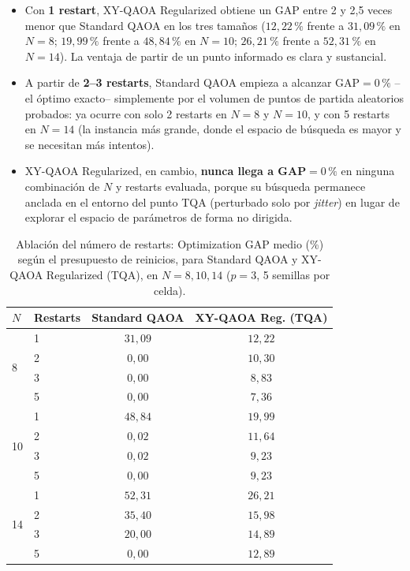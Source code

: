 \begin{itemize}
    \item Con \textbf{1 restart}, XY-QAOA Regularized obtiene un GAP entre 2 y 2,5 veces menor que Standard QAOA en los tres tamaños ($12{,}22\,\%$ frente a $31{,}09\,\%$ en $N=8$; $19{,}99\,\%$ frente a $48{,}84\,\%$ en $N=10$; $26{,}21\,\%$ frente a $52{,}31\,\%$ en $N=14$). La ventaja de partir de un punto informado es clara y sustancial.
    \item A partir de \textbf{2--3 restarts}, Standard QAOA empieza a alcanzar GAP$=0\,\%$ --el óptimo exacto-- simplemente por el volumen de puntos de partida aleatorios probados: ya ocurre con solo 2 restarts en $N=8$ y $N=10$, y con 5 restarts en $N=14$ (la instancia más grande, donde el espacio de búsqueda es mayor y se necesitan más intentos).
    \item XY-QAOA Regularized, en cambio, \textbf{nunca llega a GAP$=0\,\%$} en ninguna combinación de $N$ y restarts evaluada, porque su búsqueda permanece anclada en el entorno del punto TQA (perturbado solo por \textit{jitter}) en lugar de explorar el espacio de parámetros de forma no dirigida.
\end{itemize}

\begin{table}[htbp]
\centering
\caption{Ablación del número de restarts: Optimization GAP medio (\%) según el presupuesto de reinicios, para Standard QAOA y XY-QAOA Regularized (TQA), en $N=8,10,14$ ($p=3$, 5 semillas por celda).}
\label{tab:restarts-ablation}
\begin{tabular}{llcc}
\toprule
\textbf{$N$} & \textbf{Restarts} & \textbf{Standard QAOA} & \textbf{XY-QAOA Reg. (TQA)} \\
\midrule
\multirow{4}{*}{8}  & 1 & $31{,}09$ & $12{,}22$ \\
                     & 2 & $0{,}00$  & $10{,}30$ \\
                     & 3 & $0{,}00$  & $8{,}83$  \\
                     & 5 & $0{,}00$  & $7{,}36$  \\
\midrule
\multirow{4}{*}{10} & 1 & $48{,}84$ & $19{,}99$ \\
                     & 2 & $0{,}02$  & $11{,}64$ \\
                     & 3 & $0{,}02$  & $9{,}23$  \\
                     & 5 & $0{,}00$  & $9{,}23$  \\
\midrule
\multirow{4}{*}{14} & 1 & $52{,}31$ & $26{,}21$ \\
                     & 2 & $35{,}40$ & $15{,}98$ \\
                     & 3 & $20{,}00$ & $14{,}89$ \\
                     & 5 & $0{,}00$  & $12{,}89$ \\
\bottomrule
\end{tabular}
\end{table}

